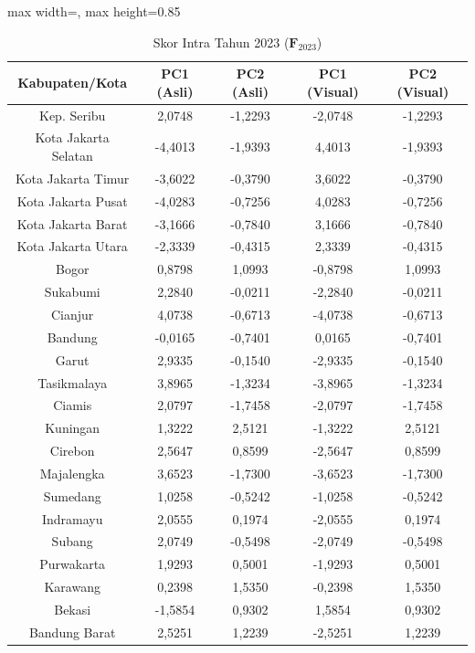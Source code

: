 \begin{table}[H]
\centering
\caption{Skor Intra Tahun 2023 ($\mathbf{F}_{2023}$)} \label{tab:app2skor_intra_2023}
\begin{adjustbox}{max width=\textwidth, max height=0.85\textheight}
\begin{tabular}{|c|c|c|c|c|}
\hline
\textbf{Kabupaten/Kota} & \textbf{PC1 (Asli)} & \textbf{PC2 (Asli)} & \textbf{PC1 (Visual)} & \textbf{PC2 (Visual)} \\
\hline
Kep. Seribu & 2,0748 & -1,2293 & -2,0748 & -1,2293 \\
Kota Jakarta Selatan & -4,4013 & -1,9393 & 4,4013 & -1,9393 \\
Kota Jakarta Timur & -3,6022 & -0,3790 & 3,6022 & -0,3790 \\
Kota Jakarta Pusat & -4,0283 & -0,7256 & 4,0283 & -0,7256 \\
Kota Jakarta Barat & -3,1666 & -0,7840 & 3,1666 & -0,7840 \\
Kota Jakarta Utara & -2,3339 & -0,4315 & 2,3339 & -0,4315 \\
Bogor & 0,8798 & 1,0993 & -0,8798 & 1,0993 \\
Sukabumi & 2,2840 & -0,0211 & -2,2840 & -0,0211 \\
Cianjur & 4,0738 & -0,6713 & -4,0738 & -0,6713 \\
Bandung & -0,0165 & -0,7401 & 0,0165 & -0,7401 \\
Garut & 2,9335 & -0,1540 & -2,9335 & -0,1540 \\
Tasikmalaya & 3,8965 & -1,3234 & -3,8965 & -1,3234 \\
Ciamis & 2,0797 & -1,7458 & -2,0797 & -1,7458 \\
Kuningan & 1,3222 & 2,5121 & -1,3222 & 2,5121 \\
Cirebon & 2,5647 & 0,8599 & -2,5647 & 0,8599 \\
Majalengka & 3,6523 & -1,7300 & -3,6523 & -1,7300 \\
Sumedang & 1,0258 & -0,5242 & -1,0258 & -0,5242 \\
Indramayu & 2,0555 & 0,1974 & -2,0555 & 0,1974 \\
Subang & 2,0749 & -0,5498 & -2,0749 & -0,5498 \\
Purwakarta & 1,9293 & 0,5001 & -1,9293 & 0,5001 \\
Karawang & 0,2398 & 1,5350 & -0,2398 & 1,5350 \\
Bekasi & -1,5854 & 0,9302 & 1,5854 & 0,9302 \\
Bandung Barat & 2,5251 & 1,2239 & -2,5251 & 1,2239 \\

\end{tabular}
\end{adjustbox}
\end{table}
